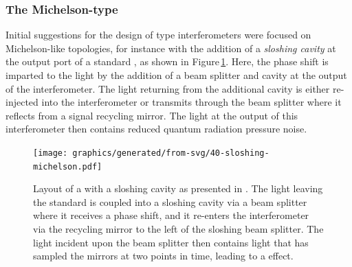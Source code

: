 \subsubsection{The Michelson-type \SM{}}
Initial suggestions for the design of \SM{} type interferometers were focused on Michelson-like topologies, for instance with the addition of a \emph{sloshing cavity} \cite{Braginsky2000, Purdue2002} at the output port of a standard \FPMI{}, as shown in Figure\,\ref{fig:sloshing-michelson}. Here, the phase shift is imparted to the light by the addition of a beam splitter and cavity at the output of the interferometer. The light returning from the additional cavity is either re-injected into the interferometer or transmits through the beam splitter where it reflects from a signal recycling mirror. The light at the output of this interferometer then contains reduced quantum radiation pressure noise.

\begin{figure}
  \centering
  \texttt{[image: graphics/generated/from-svg/40-sloshing-michelson.pdf]}
  \caption[Layout of a \MI{} with a sloshing cavity]{\label{fig:sloshing-michelson}Layout of a \MI{} with a sloshing cavity as presented in \cite{Purdue2002}. The light leaving the standard \MI{} is coupled into a sloshing cavity via a beam splitter where it receives a phase shift, and it re-enters the interferometer via the recycling mirror to the left of the sloshing beam splitter. The light incident upon the beam splitter then contains light that has sampled the mirrors at two points in time, leading to a \SM{} effect.}
\end{figure}


